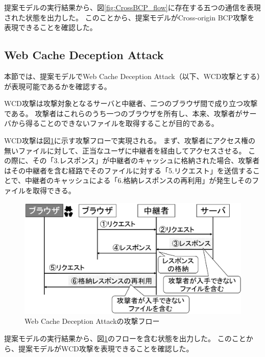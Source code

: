 \documentclass[journal]{IEEEtran}
\begin{document}
提案モデルの実行結果から、図\ref{fig:CrossBCP_flow}に存在する五つの通信を表現された状態を出力した。
このことから、提案モデルがCross-origin BCP攻撃を表現できることを確認した。

\subsection{Web Cache Deception Attack}
本節では、提案モデルでWeb Cache Deception Attack\cite{WCD}（以下、WCD攻撃とする）が表現可能であるかを確認する。

WCD攻撃は攻撃対象となるサーバと中継者、二つのブラウザ間で成り立つ攻撃である。
攻撃者はこれらのうち一つのブラウザを所有し、本来、攻撃者がサーバから得ることのできないファイルを取得することが目的である。

WCD攻撃は図\ref{fig:WCD_flow}に示す攻撃フローで実現される。
まず、攻撃者にアクセス権の無いファイルに対して、正当なユーザに中継者を経由してアクセスさせる。
この際に、その「3.レスポンス」が中継者のキャッシュに格納された場合、攻撃者はその中継者を含む経路でそのファイルに対する「5.リクエスト」を送信することで、中継者のキャッシュによる「6.格納レスポンスの再利用」が発生しそのファイルを取得できる。

\begin{figure}[htb]
\centering
\includegraphics[width=\hsize]{./fig/WCD_flow.eps}
\caption{Web Cache Deception Attackの攻撃フロー}
\label{fig:WCD_flow}
\end{figure}

提案モデルの実行結果から、図\ref{fig:WCD_flow}のフローを含む状態を出力した。
このことから、提案モデルがWCD攻撃を表現できることを確認した。
\end{document}
